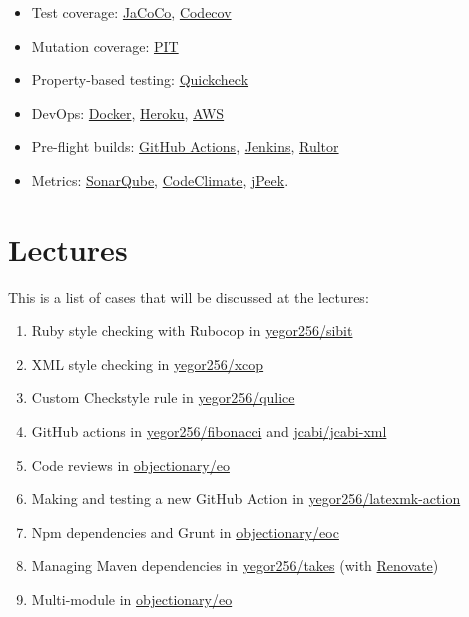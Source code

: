 \documentclass[nobrand,anonymous,nodate,nosecurity]{huawei}
\begin{document}
{\begin{itemize}
\item Test coverage:
	\href{https://www.eclemma.org/jacoco/}{JaCoCo},
	\href{codecov.io/}{Codecov}
\item Mutation coverage:
	\href{https://www.pitest.org}{PIT}
\item Property-based testing:
	\href{https://en.wikipedia.org/wiki/QuickCheck}{Quickcheck}
\item DevOps:
	\href{https://www.docker.com}{Docker},
	\href{https://www.heroku.com}{Heroku},
	\href{https://aws.amazon.com/}{AWS}
\item Pre-flight builds:
	\href{https://github.com/features/actions}{GitHub Actions},
	\href{https://www.jenkins.io}{Jenkins},
	\href{https://www.rultor.com}{Rultor}
\item Metrics:
	\href{https://www.sonarqube.org}{SonarQube},
	\href{https://codeclimate.com/}{CodeClimate},
	\href{https://www.jpeek.org}{jPeek}.
\end{itemize}

\newpage
\section*{Lectures}

\newcommand\github[1]{\href{https://github.com/#1}{#1}}

This is a list of cases that will be discussed at the lectures:

\begin{enumerate}
	\item Ruby style checking with Rubocop in \github{yegor256/sibit}
  \item XML style checking in \github{yegor256/xcop}
	\item Custom Checkstyle rule in \github{yegor256/qulice}
  \vspace{3pt}

  \item GitHub actions in \github{yegor256/fibonacci} and \github{jcabi/jcabi-xml}
	\item Code reviews in \github{objectionary/eo}
  \item Making and testing a new GitHub Action in \github{yegor256/latexmk-action}
  \vspace{3pt}

	\item Npm dependencies and Grunt in \github{objectionary/eoc}
	\item Managing Maven dependencies in \github{yegor256/takes} (with \href{https://github.com/renovatebot/renovate}{Renovate})
	\item Multi-module  in \github{objectionary/eo}
  \vspace{3pt}


\end{enumerate}}
\end{document}
